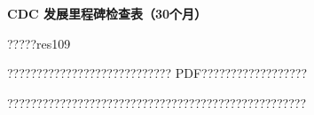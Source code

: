 \documentclass[11pt]{article}
\begin{document}
{\color[HTML]{0A84FF}\LARGE\bfseries CDC 发展里程碑检查表（30个月）\par}
{\color[HTML]{667085}\small ?????res109\par}
\vspace{1em}
???????????????????????????? PDF??????????????????

???????????????????????????????????????????????????
\end{document}
